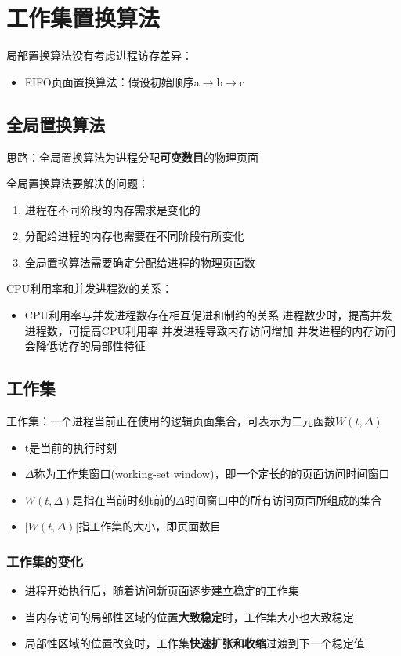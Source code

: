 \section{工作集置换算法}
局部置换算法没有考虑进程访存差异：
\begin{itemize}
	\item FIFO页面置换算法：假设初始顺序a$\rightarrow$b$\rightarrow$c
\end{itemize}
\subsection{全局置换算法}
思路：全局置换算法为进程分配\textbf{可变数目}的物理页面
\par 全局置换算法要解决的问题：
\begin{enumerate}
	\item 进程在不同阶段的内存需求是变化的
	\item 分配给进程的内存也需要在不同阶段有所变化
	\item 全局置换算法需要确定分配给进程的物理页面数
\end{enumerate}
CPU利用率和并发进程数的关系：
\begin{itemize}
	\item CPU利用率与并发进程数存在相互促进和制约的关系
	\subitem 进程数少时，提高并发进程数，可提高CPU利用率
	\subitem 并发进程导致内存访问增加
	\subitem 并发进程的内存访问会降低访存的局部性特征
\end{itemize}
\subsection{工作集}
工作集：一个进程当前正在使用的逻辑页面集合，可表示为二元函数$W(t,\Delta)$
\begin{itemize}
	\item t是当前的执行时刻
	\item $\Delta$称为工作集窗口(working-set window)，即一个定长的的页面访问时间窗口
	\item $W(t,\Delta)$是指在当前时刻t前的$\Delta$时间窗口中的所有访问页面所组成的集合
	\item $|W(t,\Delta)|$指工作集的大小，即页面数目
\end{itemize}
\subsubsection*{工作集的变化}
\begin{itemize}
	\item 进程开始执行后，随着访问新页面逐步建立稳定的工作集
	\item 当内存访问的局部性区域的位置\textbf{大致稳定}时，工作集大小也大致稳定
	\item 局部性区域的位置改变时，工作集\textbf{快速扩张和收缩}过渡到下一个稳定值
\end{itemize}
